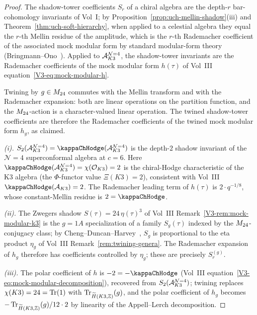 \begin{proof}
The shadow-tower coefficients $S_r$ of a chiral algebra are the depth-$r$
bar-cohomology invariants of Vol~I; by
Proposition~\ref{prop:uch-mellin-shadow}(iii) and
Theorem~\ref{thm:uch-soft-hierarchy}, when applied to a celestial
algebra they equal the $r$-th Mellin residue of the amplitude, which
is the $r$-th Rademacher coefficient of the associated mock modular
form by standard modular-form theory
(Bringmann--Ono~\cite{BringmannOno10}). Applied to
$\mathcal A^{\mathcal{N}{=}4}_{K3}$, the shadow-tower invariants are the
Rademacher coefficients of the mock modular form
$h(\tau)$ of Vol~III equation~\eqref{V3-eq:mock-modular-h}.

Twining by $g \in M_{24}$ commutes with the Mellin transform and
with the Rademacher expansion: both are linear operations on the
partition function, and the $M_{24}$-action is a character-valued
linear operation. The twined shadow-tower coefficients are therefore
the Rademacher coefficients of the twined mock modular form $h_g$, as
claimed.

\emph{(i).}
$S_2(\cA^{\mathcal{N}{=}4}_{K3}) = \kapch(\cA^{\mathcal{N}{=}4}_{K3})$
is the depth-$2$ shadow invariant of the $\mathcal{N}{=}4$ superconformal
algebra at $c = 6$. Here $\kapch(\cA^{\mathcal{N}{=}4}_{K3}) =
\chi(\cO_{K3}) = 2$ is the chiral-Hodge characteristic of the K3 algebra
(the $\Phi$-functor value $\Xi(K3) = 2$), consistent with
Vol~III $\kapch(\cA_{K3}) = 2$. The Rademacher leading term of
$h(\tau)$ is $2\cdot q^{-1/8}$, whose constant-Mellin residue is
$2 = \kapch$.

\emph{(ii).}
The Zwegers shadow
$S(\tau) = 24\,\eta(\tau)^3$ of Vol~III
Remark~\ref{V3-rem:mock-modular-k3} is the $g = 1A$ specialization of a
family $S_g(\tau)$ indexed by the $M_{24}$-conjugacy class; by
Cheng--Duncan--Harvey~\cite{ChengDuncanHarvey1}, $S_g$ is proportional
to the eta product $\eta_g$ of Vol~III
Remark~\ref{rem:twining-genera}. The Rademacher expansion of $h_g$
therefore has coefficients controlled by $\eta_g$; these are precisely
$S_r^{(g)}$.

\emph{(iii).}
The polar coefficient of $h$ is
$-2 = -\kapch$ (Vol~III equation~\eqref{V3-eq:mock-modular-decomposition}),
recovered from $S_2(\mathcal A^{\mathcal{N}{=}4}_{K3})$; twining replaces
$\chi(K3) = 24 = \operatorname{Tr}(1)$ with $\operatorname{Tr}_{\widetilde H(K3,\mathbb Z)}(g)$, and
the polar coefficient of $h_g$ becomes
$-\operatorname{Tr}_{\widetilde H(K3,\mathbb Z)}(g) / 12 \cdot 2$
by linearity of the Appell--Lerch decomposition.
\end{proof}

